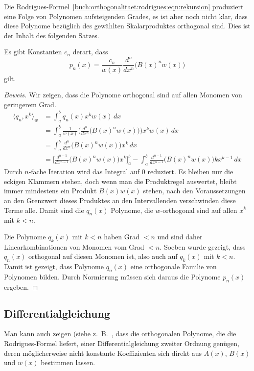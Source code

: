 Die Rodrigues-Formel~\eqref{buch:orthogonalitaet:rodrigues:eqn:rekursion}
produziert eine Folge von Polynomen aufsteigenden Grades, es ist aber
noch nicht klar, dass diese Polynome bezüglich des gewählten Skalarproduktes
orthogonal sind.
Dies ist der Inhalt des folgenden Satzes.

\begin{satz}
Es gibt Konstanten $c_n$ derart, dass
\[
p_n(x)
=
\frac{c_n}{w(x)} \frac{d^n}{dx^n} \bigl(B(x)^n w(x)\bigr) 
\]
gilt.
\end{satz}

\begin{proof}[Beweis]
Wir zeigen, dass die Polynome orthogonal sind auf allen Monomen
von geringerem Grad.
\begin{align*}
\langle q_n, x^k\rangle_w
&=
\int_a^b q_n(x)x^kw(x)\,dx
\\
&=
\int_a^b \frac{1}{w(x)}
\biggl(\frac{d^n}{dx^n}\bigl(B(x)^n w(x)\bigr)\biggr)
x^k w(x)\,dx
\\
&=
\int_a^b \frac{d^n}{dx^n}\bigl(B(x)^n w(x)\bigr) x^k \,dx
\\
&=
\biggl[\frac{d^{n-1}}{dx^{n-1}}\bigl(B(x)^n w(x)\bigr) x^k \biggr]_a^b
-
\int_a^b \frac{d^{n-1}}{dx^{n-1}}\bigl(B(x)^n w(x)\bigr)kx^{k-1}\,dx
\end{align*}
Durch $n$-fache Iteration wird das Integral auf $0$ reduziert.
Es bleiben nur die eckigen Klammern stehen, doch wenn man die Produktregel
auswertet, bleibt immer mindestens ein Produkt $B(x)w(x)$ stehen,
nach den Voraussetzungen an den Grenzwert dieses Produktes an den
Intervallenden verschwinden diese Terme alle.
Damit sind die $q_n(x)$ Polynome, die $w$-orthogonal sind auf allen
$x^k$ mit $k<n$.

Die Polynome $q_k(x)$ mit $k< n$ haben Grad $<n$ und sind daher
Linearkombinationen von Monomen vom Grad $<n$.
Soeben wurde gezeigt, dass $q_n(x)$ orthogonal auf diesen Monomen
ist, also auch auf $q_k(x)$ mit $k<n$.
Damit ist gezeigt, dass Polynome $q_n(x)$ eine orthogonale Familie
von Polynomen bilden.
Durch Normierung müssen sich daraus die Polynome $p_n(x)$ ergeben.
\end{proof}

\subsection{Differentialgleichung}
Man kann auch zeigen (siehe z.~B.~\cite{buch:pearsondgl},
dass die orthogonalen Polynome, die die
Rodrigues-Formel liefert, einer Differentialgleichung zweiter 
Ordnung genügen, deren möglicherweise nicht konstante Koeffizienten
sich direkt aus $A(x)$, $B(x)$ und $w(x)$ bestimmen lassen.

